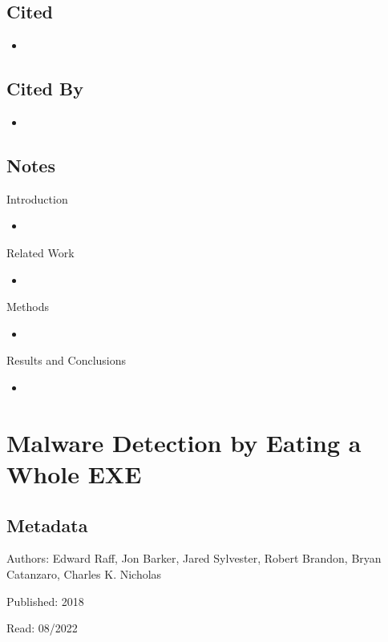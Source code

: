\documentclass{article}
\begin{document}
\subsection*{Cited}
\begin{itemize}
\item
\end{itemize}

\subsection*{Cited By}
\begin{itemize}
\item
\end{itemize}

\subsection*{Notes}

Introduction
\begin{itemize}
\item
\end{itemize}
Related Work
\begin{itemize}
\item
\end{itemize}
Methods
\begin{itemize}
\item
\end{itemize}
Results and Conclusions
\begin{itemize}
\item
\end{itemize}

\pagebreak


\section*{Malware Detection by Eating a Whole EXE}

\subsection*{Metadata}

\noindent Authors: Edward Raff, Jon Barker, Jared Sylvester, Robert Brandon, Bryan Catanzaro, Charles K. Nicholas

\noindent Published: 2018

\noindent Read: 08/2022
\end{document}
